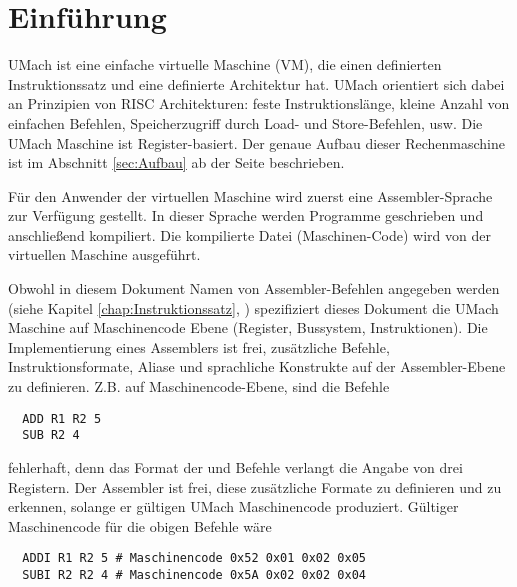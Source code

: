 \chapter{Einführung}
UMach ist eine einfache virtuelle Maschine (VM), die einen definierten
Instruktionssatz und eine definierte Architektur hat. UMach orientiert
sich dabei an Prinzipien von RISC Architekturen: feste Instruktionslänge,
kleine Anzahl von einfachen Befehlen, Speicherzugriff durch Load- und
Store-Befehlen, usw. Die UMach Maschine ist Register-basiert.
Der genaue Aufbau dieser Rechenmaschine ist im Abschnitt
\ref{sec:Aufbau} ab der Seite \pageref{sec:Aufbau} beschrieben.


Für den Anwender der virtuellen Maschine wird zuerst eine Assembler-Sprache zur
Verfügung gestellt. In dieser Sprache werden Programme geschrieben und
anschließend kompiliert. Die kompilierte Datei (Maschinen-Code) wird
von der virtuellen Maschine ausgeführt.

Obwohl in diesem Dokument Namen von Assembler-Befehlen angegeben werden (siehe 
Kapitel \ref{chap:Instruktionssatz}, )
spezifiziert dieses Dokument die UMach Maschine auf Maschinencode Ebene
(Register, Bussystem, Instruktionen).
Die Implementierung eines Assemblers ist frei, zusätzliche Befehle,
Instruktionsformate, Aliase und sprachliche Konstrukte auf der Assembler-Ebene
zu definieren. Z.B. auf Maschinencode-Ebene, sind die Befehle
\begin{lstlisting}
  ADD R1 R2 5
  SUB R2 4
\end{lstlisting}
fehlerhaft, denn das Format der  und  Befehle verlangt die
Angabe von drei Registern. Der Assembler ist frei, diese zusätzliche Formate zu
definieren und zu erkennen, solange er gültigen UMach Maschinencode produziert.
Gültiger Maschinencode für die obigen Befehle wäre
\begin{lstlisting}
  ADDI R1 R2 5 # Maschinencode 0x52 0x01 0x02 0x05
  SUBI R2 R2 4 # Maschinencode 0x5A 0x02 0x02 0x04
\end{lstlisting}



